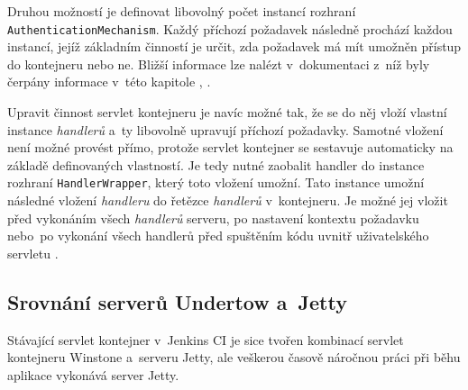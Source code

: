                 Druhou možností je definovat
                libovolný počet instancí rozhraní \\\texttt{AuthenticationMechanism}. Každý příchozí požadavek
                následně prochází každou instancí, jejíž základním činností je určit, zda požadavek má
                mít umožněn přístup do kontejneru nebo ne. Bližší informace lze nalézt v~dokumentaci z~níž
                byly čerpány informace v~této kapitole \cite{undertowDeployment}, \cite{undertowSecurity}.

                \medskip
                Upravit činnost servlet kontejneru je navíc možné tak, že se do něj vloží vlastní instance
                \emph{handlerů} a~ty libovolně upravují příchozí požadavky. Samotné vložení
                není možné provést přímo, protože servlet kontejner se sestavuje automaticky na základě
                definovaných vlastností. Je tedy nutné zaobalit handler do instance rozhraní \texttt{HandlerWrapper},
                který toto vložení umožní. Tato instance umožní následné vložení \emph{handleru} do řetězce \emph{handlerů}
                v~kontejneru. Je možné jej vložit před vykonáním všech \emph{handlerů} serveru, po
                nastavení kontextu požadavku nebo~po vykonání všech handlerů před spuštěním kódu uvnitř uživatelského 
                servletu \cite{undertowDeployment}.
 
        
        \subsection{Srovnání serverů Undertow a~Jetty}\label{srovnani}
            Stávající servlet kontejner v~Jenkins CI je sice tvořen
            kombinací servlet kontejneru Winstone a~serveru Jetty, ale veškerou
            časově náročnou práci při běhu aplikace vykonává server
            Jetty. 
            
